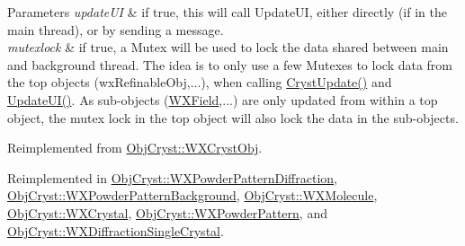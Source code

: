 \begin{DoxyParams}{Parameters}
{\em update\+UI} & if true, this will call Update\+UI, either directly (if in the main thread), or by sending a message. \\
\hline
{\em mutexlock} & if true, a Mutex will be used to lock the data shared between main and background thread. The idea is to only use a few Mutexes to lock data from the top objects (wx\+Refinable\+Obj,...), when calling \mbox{\hyperlink{class_obj_cryst_1_1_w_x_refinable_obj_a8249d288e62ad1ebffeea91f77ae37a3}{Cryst\+Update()}} and \mbox{\hyperlink{class_obj_cryst_1_1_w_x_refinable_obj_acbf70975a79661a73a1ae3c39c9c3045}{Update\+U\+I()}}. As sub-\/objects (\mbox{\hyperlink{class_obj_cryst_1_1_w_x_field}{W\+X\+Field}},...) are only updated from within a top object, the mutex lock in the top object will also lock the data in the sub-\/objects. \\
\hline
\end{DoxyParams}


Reimplemented from \mbox{\hyperlink{class_obj_cryst_1_1_w_x_cryst_obj_a1ea28fa0a66b5163b66bf42a8d1451b3}{Obj\+Cryst\+::\+W\+X\+Cryst\+Obj}}.



Reimplemented in \mbox{\hyperlink{class_obj_cryst_1_1_w_x_powder_pattern_diffraction_a1da4c9c31433e1cee6bf77afca30818e}{Obj\+Cryst\+::\+W\+X\+Powder\+Pattern\+Diffraction}}, \mbox{\hyperlink{class_obj_cryst_1_1_w_x_powder_pattern_background_a88a6987f3747b2538572e91f04b8f08d}{Obj\+Cryst\+::\+W\+X\+Powder\+Pattern\+Background}}, \mbox{\hyperlink{class_obj_cryst_1_1_w_x_molecule_a19b65e2f9b5da859675278ff74f3f5e9}{Obj\+Cryst\+::\+W\+X\+Molecule}}, \mbox{\hyperlink{class_obj_cryst_1_1_w_x_crystal_a4b48719679bb8be44eb77a45ac28f4fb}{Obj\+Cryst\+::\+W\+X\+Crystal}}, \mbox{\hyperlink{class_obj_cryst_1_1_w_x_powder_pattern_a8bdd59548c11c11a53197c0679c258a8}{Obj\+Cryst\+::\+W\+X\+Powder\+Pattern}}, and \mbox{\hyperlink{class_obj_cryst_1_1_w_x_diffraction_single_crystal_aa66e0abac5c2e4e24ccb1c982548bd4c}{Obj\+Cryst\+::\+W\+X\+Diffraction\+Single\+Crystal}}.

